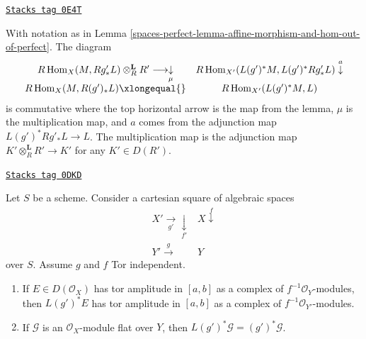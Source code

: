 \begin{remark}
\label{spaces-perfect-remark-multiplication-map}
\href{https://stacks.math.columbia.edu/tag/0E4T}{\texttt{Stacks tag 0E4T}}

With notation as in Lemma \ref{spaces-perfect-lemma-affine-morphism-and-hom-out-of-perfect}.
The diagram
$$
\begin{array}{cc}R\Hom_X(M, Rg'_*L) \otimes_R^\mathbf{L} R' \longrightarrow\underset{\mu}{\downarrow} & R\Hom_{X'}(L(g')^*M, L(g')^*Rg'_*L) \overset{a}{\downarrow} \\ R\Hom_X(M, R(g')_*L) \xlongequal{} & R\Hom_{X'}(L(g')^*M, L)\end{array}
$$
is commutative where the top horizontal arrow is the map from the lemma,
$\mu$ is the multiplication map, and $a$ comes from the adjunction map
$L(g')^*Rg'_*L \to L$. The multiplication map is the adjunction map
$K' \otimes_R^\mathbf{L} R' \to K'$ for any $K' \in D(R')$.
\end{remark}

\begin{lemma}
\label{spaces-perfect-lemma-tor-independence-and-tor-amplitude}
\href{https://stacks.math.columbia.edu/tag/0DKD}{\texttt{Stacks tag 0DKD}}

Let $S$ be a scheme. Consider a cartesian square of algebraic spaces
$$
\begin{array}{cc}X' \underset{g'}{\longrightarrow}\underset{f'}{\downarrow} & X \overset{f}{\downarrow} \\ Y' \overset{g}{\longrightarrow} & Y\end{array}
$$
over $S$. Assume $g$ and $f$ Tor independent.
\begin{enumerate}
\item If $E \in D(\mathcal{O}_X)$ has tor amplitude
in $[a, b]$ as a complex of $f^{-1}\mathcal{O}_Y$-modules,
then $L(g')^*E$ has tor amplitude
in $[a, b]$ as a complex of $f^{-1}\mathcal{O}_{Y'}$-modules.
\item If $\mathcal{G}$ is an $\mathcal{O}_X$-module flat
over $Y$, then $L(g')^*\mathcal{G} = (g')^*\mathcal{G}$.
\end{enumerate}
\end{lemma}

